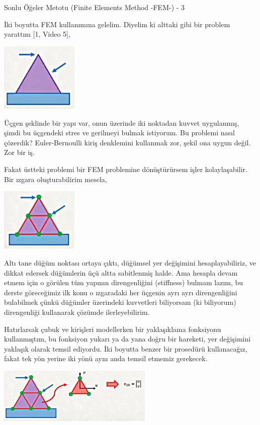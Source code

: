 \documentclass[12pt,fleqn]{article}\usepackage{../../common}
\begin{document}
Sonlu Öğeler Metotu (Finite Elements Method -FEM-) - 3

İki boyutta FEM kullanımına gelelim. Diyelim ki alttaki gibi bir problem
yarattım [1, Video 5],

\includegraphics[width=10em]{compscieng_bpp45fem3_01.jpg}

Üçgen şeklinde bir yapı var, onun üzerinde iki noktadan kuvvet uygulanmış, şimdi
bu üçgendeki stres ve gerilmeyi bulmak istiyorum. Bu problemi nasıl çözerdik?
Euler-Bernoulli kiriş denklemini kullanmak zor, şekil ona uygun değil. Zor bir
iş.

Fakat üstteki problemi bir FEM problemine dönüştürürsem işler
kolaylaşabilir. Bir ızgara oluşturabilirim mesela,

\includegraphics[width=10em]{compscieng_bpp45fem3_02.jpg}

Altı tane düğüm noktası ortaya çıktı, düğümsel yer değişimini hesaplayabiliriz,
ve dikkat edersek düğümlerin üçü altta sabitlenmiş halde. Ama hesapla devam
etmem için o görülen tüm yapının direngenliğini (stiffness) bulmam lazım, bu
derste göreceğimiz ilk konu o ızgaradaki her üçgenin ayrı ayrı direngenliğini
bulabilmek çünkü düğümler üzerindeki kuvvetleri biliyorsam (ki biliyorum)
direngenliği kullanarak çözümde ilerleyebilirim.

Hatırlarsak çubuk ve kirişleri modellerken bir yaklaşıklama fonksiyonu
kullanmıştım, bu fonksiyon yukarı ya da yana doğru bir hareketi, yer değişimini
yaklaşık olarak temsil ediyordu. İki boyutta benzer bir prosedürü kullanacağız,
fakat tek yön yerine iki yönü aynı anda temsil etmemiz gerekecek.

\includegraphics[width=20em]{compscieng_bpp45fem3_03.jpg}
\end{document}
